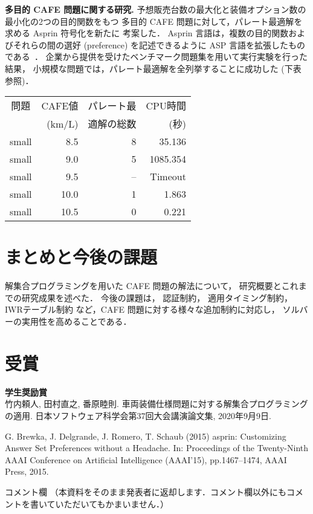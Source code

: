 \documentclass[a4j,10pt]{jarticle}
\begin{document}
\begin{multicols}{1}
\textbf{多目的 CAFE 問題に関する研究. }
予想販売台数の最大化と装備オプション数の最小化の2つの目的関数をもつ
多目的 CAFE 問題に対して，パレート最適解を求める Asprin 符号化を新たに
考案した．
Asprin 言語は，複数の目的関数およびそれらの間の選好 (preference)
を記述できるように ASP 言語を拡張したものである~\cite{brewka_15}．
%
企業から提供を受けたベンチマーク問題集を用いて実行実験を行った結果，
小規模な問題では，パレート最適解を全列挙することに成功した
(下表参照)．

\begin{center}
  \begin{tabular}{c|r|rr}
  問題   & CAFE値  & パレート最 & CPU時間 \\
         & (km/L)  & 適解の総数  & (秒) \\ \hline
  small  & 8.5   & 8             & 35.136     \\
  small  & 9.0   & 5             & 1085.354   \\
  small  & 9.5   & --            & Timeout    \\
  small  & 10.0  & 1             & 1.863      \\
  small  & 10.5  & 0             & 0.221      \\ \hline
 \end{tabular}
\end{center}


\section{まとめと今後の課題}
解集合プログラミングを用いた CAFE 問題の解法について，
研究概要とこれまでの研究成果を述べた．
今後の課題は，
認証制約，
適用タイミング制約，
IWRテーブル制約
など，CAFE 問題に対する様々な追加制約に対応し，
ソルバーの実用性を高めることである．

\section{受賞}

\noindent\textbf{学生奨励賞}\\
竹内頼人, 田村直之, 番原睦則.
車両装備仕様問題に対する解集合プログラミングの適用.
日本ソフトウェア科学会第37回大会講演論文集,
2020年9月9日. 

\begin{thebibliography}{10}
G. Brewka, J. Delgrande, J. Romero, T. Schaub (2015) 
asprin: Customizing Answer Set Preferences without a Headache.
In: Proceedings of the Twenty-Ninth AAAI Conference on Artificial
Intelligence (AAAI'15), pp.1467--1474, AAAI Press, 2015.
\end{thebibliography}


\end{multicols}
\vfill
\noindent
{\gt コメント欄}
{\footnotesize
（本資料をそのまま発表者に返却します．コメント欄以外にもコメントを書いていただいてもかまいません．）}
\\
\fbox{\begin{minipage}{\textwidth}\noindent\\\\\end{minipage}}	
\end{document}
